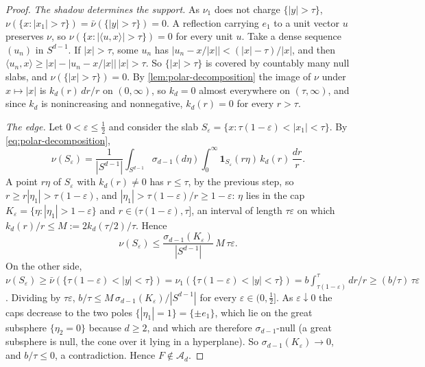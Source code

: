 \begin{proof}
\emph{The shadow determines the support.} As $\nu_1$ does not charge $\{|y| > \tau\}$,
$\nu(\{x : |x_1| > \tau\}) = \bar\nu(\{|y| > \tau\}) = 0$. A reflection carrying $e_1$ to a unit
vector $u$ preserves $\nu$, so $\nu(\{x : |\langle u,x\rangle| > \tau\}) = 0$ for every unit $u$.
Take a dense sequence $(u_n)$ in $S^{d-1}$. If $|x| > \tau$, some $u_n$ has
$|u_n - x/|x|| < (|x|-\tau)/|x|$, and then $\langle u_n,x\rangle \ge |x| - |u_n - x/|x||\,|x| >
\tau$. So $\{|x| > \tau\}$ is covered by countably many null slabs, and
$\nu(\{|x| > \tau\}) = 0$. By \ref{lem:polar-decomposition} the image of $\nu$ under
$x \mapsto |x|$ is $k_d(r)\,dr/r$ on $(0,\infty)$, so $k_d = 0$ almost everywhere on
$(\tau,\infty)$, and since $k_d$ is nonincreasing and nonnegative, $k_d(r) = 0$ for every
$r > \tau$.

\emph{The edge.} Let $0 < \varepsilon \le \tfrac12$ and consider the slab
$S_\varepsilon = \{x : \tau(1-\varepsilon) < |x_1| < \tau\}$. By \ref{eq:polar-decomposition},
\[
  \nu(S_\varepsilon) = \frac{1}{|S^{d-1}|}\int_{S^{d-1}}\sigma_{d-1}(d\eta)\int_0^\infty
    \mathbf 1_{S_\varepsilon}(r\eta)\,k_d(r)\,\frac{dr}{r} .
\]
A point $r\eta$ of $S_\varepsilon$ with $k_d(r) \ne 0$ has $r \le \tau$, by the previous step, so
$r \ge r|\eta_1| > \tau(1-\varepsilon)$, and $|\eta_1| > \tau(1-\varepsilon)/r \ge 1-\varepsilon$:
$\eta$ lies in the cap $K_\varepsilon = \{\eta : |\eta_1| > 1-\varepsilon\}$ and
$r \in (\tau(1-\varepsilon), \tau]$, an interval of length $\tau\varepsilon$ on which
$k_d(r)/r \le M := 2k_d(\tau/2)/\tau$. Hence
\[
  \nu(S_\varepsilon) \le \frac{\sigma_{d-1}(K_\varepsilon)}{|S^{d-1}|}\,M\,\tau\varepsilon .
\]
On the other side, $\nu(S_\varepsilon) \ge \bar\nu(\{\tau(1-\varepsilon) < |y| < \tau\}) =
\nu_1(\{\tau(1-\varepsilon) < |y| < \tau\}) = b\int_{\tau(1-\varepsilon)}^\tau dr/r \ge
(b/\tau)\,\tau\varepsilon$. Dividing by $\tau\varepsilon$,
$b/\tau \le M\,\sigma_{d-1}(K_\varepsilon)/|S^{d-1}|$ for every $\varepsilon \in (0,\tfrac12]$.
As $\varepsilon \downarrow 0$ the caps decrease to the two poles $\{|\eta_1| = 1\} = \{\pm e_1\}$,
which lie on the great subsphere $\{\eta_2 = 0\}$ because $d \ge 2$, and which are therefore
$\sigma_{d-1}$-null (a great subsphere is null, the cone over it lying in a hyperplane). So $\sigma_{d-1}(K_\varepsilon) \to 0$, and $b/\tau \le 0$, a contradiction.
Hence $F \notin \mathcal{A}_d$.
\end{proof}

